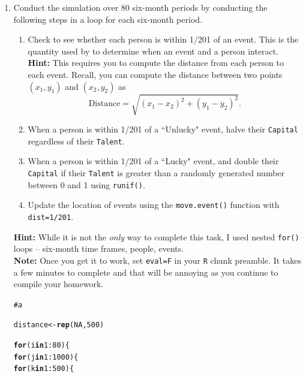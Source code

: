 \documentclass{article}\usepackage[]{graphicx}\usepackage[]{xcolor}
\makeatletter
\newcommand{\hlnum}[1]{\textcolor[rgb]{0.686,0.059,0.569}{#1}}%
\newcommand{\hlcom}[1]{\textcolor[rgb]{0.678,0.584,0.686}{\textit{#1}}}%
\newcommand{\hlopt}[1]{\textcolor[rgb]{0,0,0}{#1}}%
\newcommand{\hldef}[1]{\textcolor[rgb]{0.345,0.345,0.345}{#1}}%
\newcommand{\hlkwa}[1]{\textcolor[rgb]{0.161,0.373,0.58}{\textbf{#1}}}%
\newcommand{\hlkwb}[1]{\textcolor[rgb]{0.69,0.353,0.396}{#1}}%
\newcommand{\hlkwd}[1]{\textcolor[rgb]{0.737,0.353,0.396}{\textbf{#1}}}%
\newenvironment{kframe}{%
 \def\at@end@of@kframe{}%
 \ifinner\ifhmode%
  \def\at@end@of@kframe{\end{minipage}}%
  \begin{minipage}{\columnwidth}%
 \fi\fi%
 \def\FrameCommand##1{\hskip\@totalleftmargin \hskip-\fboxsep
 \colorbox{shadecolor}{##1}\hskip-\fboxsep
     \hskip-\linewidth \hskip-\@totalleftmargin \hskip\columnwidth}%
 \MakeFramed {\advance\hsize-\width
   \@totalleftmargin\z@ \linewidth\hsize
   \@setminipage}}%
 {\par\unskip\endMakeFramed%
 \at@end@of@kframe}
\newenvironment{knitrout}{}{} %
\makeatother
\begin{document}
\begin{enumerate}
\item Conduct the simulation over 80 six-month periods by conducting the following steps in a loop for each six-month period.
\begin{enumerate}
\item Check to see whether each person is within 1/201 of an event. This is the quantity used by \cite{Pluchino18} to determine when an event and a person interact.\\
\textbf{Hint:} This requires you to compute the distance from each person to each event. Recall, you can compute the distance between two points $(x_1, y_1)$ and $(x_2, y_2)$ as
\[\textrm{Distance} = \sqrt{(x_1-x_2)^2 + (y_1-y_2)^2}.\]
\item When a person is within 1/201 of a ``Unlucky" event, halve their \texttt{Capital} regardless of their \texttt{Talent}.
\item When a person is within 1/201 of a ``Lucky" event, and double their \texttt{Capital} if their \texttt{Talent} is greater than a randomly generated number between 0 and 1 using \texttt{runif()}. 
\item Update the location of events using the \texttt{move.event()} function with \texttt{dist=1/201}. 
\end{enumerate}
\textbf{Hint:} While it is not the \emph{only} way to complete this task, I used nested \texttt{for()} loops -- six-month time frames, people, events.\\
\textbf{Note:} Once you get it to work, set \texttt{eval=F} in your \texttt{R} chunk preamble. It takes a few minutes to complete and that will be annoying as you continue to compile your homework.\\


\begin{knitrout}\scriptsize
{}\color{fgcolor}\begin{kframe}
\begin{alltt}
\hlcom{# a}

\hldef{distance} \hlkwb{<-} \hlkwd{rep}\hldef{(}\hlnum{NA}\hldef{,} \hlnum{500}\hldef{)}

\hlkwa{for}\hldef{(i} \hlkwa{in} \hlnum{1}\hlopt{:}\hlnum{80}\hldef{)\{}
  \hlkwa{for} \hldef{(j} \hlkwa{in} \hlnum{1}\hlopt{:}\hlnum{1000}\hldef{)\{}
    \hlkwa{for}\hldef{(k} \hlkwa{in} \hlnum{1}\hlopt{:}\hlnum{500}\hldef{)\{}


\end{alltt}
\end{kframe}
\end{knitrout}
\end{enumerate}
\end{document}
